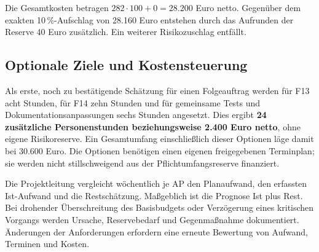 \documentclass[a4paper,10pt]{article}
\begin{document}
Die Gesamtkosten betragen $282\cdot100+0=\mathbf{28.200}$ Euro netto. Gegenüber dem exakten 10\,\%-Aufschlag von 28.160 Euro entstehen durch das Aufrunden der Reserve 40 Euro zusätzlich. Ein weiterer Risikozuschlag entfällt.

\subsection*{Optionale Ziele und Kostensteuerung}
Als erste, noch zu bestätigende Schätzung für einen Folgeauftrag werden für F13 acht Stunden, für F14 zehn Stunden und für gemeinsame Tests und Dokumentationsanpassungen sechs Stunden angesetzt. Dies ergibt \textbf{24 zusätzliche Personenstunden beziehungsweise 2.400 Euro netto}, ohne eigene Risikoreserve. Ein Gesamtumfang einschlie\ss{}lich dieser Optionen läge damit bei 30.600 Euro. Die Optionen benötigen einen eigenen freigegebenen Terminplan; sie werden nicht stillschweigend aus der Pflichtumfangsreserve finanziert.

Die Projektleitung vergleicht wöchentlich je AP den Planaufwand, den erfassten Ist-Aufwand und die Restschätzung. Ma\ss{}geblich ist die Prognose \glqq Ist plus Rest\grqq{}. Bei drohender Überschreitung des Basisbudgets oder Verzögerung eines kritischen Vorgangs werden Ursache, Reservebedarf und Gegenma\ss{}nahme dokumentiert. Änderungen der Anforderungen erfordern eine erneute Bewertung von Aufwand, Terminen und Kosten.
\end{document}
